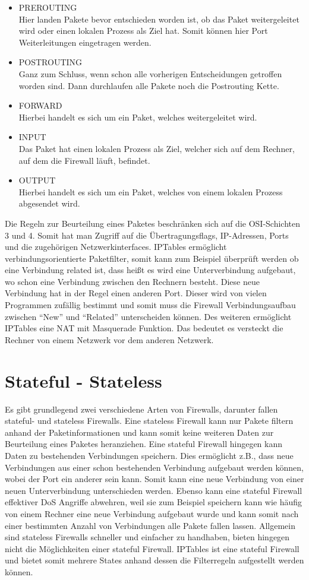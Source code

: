 \begin{itemize}
	\item PREROUTING \\
	Hier landen Pakete bevor entschieden worden ist, ob das Paket weitergeleitet wird oder einen lokalen Prozess als Ziel hat. Somit können hier Port Weiterleitungen eingetragen werden.
	\item POSTROUTING \\
	Ganz zum Schluss, wenn schon alle vorherigen Entscheidungen getroffen worden sind. Dann durchlaufen alle Pakete noch die Postrouting Kette.
	\item FORWARD \\
	Hierbei handelt es sich um ein Paket, welches weitergeleitet wird.
	\item INPUT \\
	Das Paket hat einen lokalen Prozess als Ziel, welcher sich auf dem Rechner, auf dem die Firewall läuft, befindet.
	\item OUTPUT \\
	Hierbei handelt es sich um ein Paket, welches von einem lokalen Prozess abgesendet wird.
\end{itemize}
Die Regeln zur Beurteilung eines Paketes beschränken sich auf die OSI-Schichten 3 und 4. Somit hat man Zugriff auf die Übertragungsflags, IP-Adressen, Ports und die zugehörigen Netzwerkinterfaces. IPTables ermöglicht verbindungsorientierte Paketfilter, somit kann zum Beispiel überprüft werden ob eine Verbindung related ist, dass heißt es wird eine Unterverbindung aufgebaut, wo schon eine Verbindung zwischen den Rechnern besteht. Diese neue Verbindung hat in der Regel einen anderen Port. Dieser wird von vielen Programmen zufällig bestimmt und somit muss die Firewall Verbindungsaufbau zwischen "`New"' und "`Related"' unterscheiden können. Des weiteren ermöglicht IPTables eine NAT mit Masquerade Funktion. Das bedeutet es versteckt die Rechner von einem Netzwerk vor dem anderen Netzwerk.

\section{Stateful - Stateless}
Es gibt grundlegend zwei verschiedene Arten von Firewalls, darunter fallen stateful- und stateless Firewalls. Eine stateless Firewall kann nur Pakete filtern anhand der Paketinformationen und kann somit keine weiteren Daten zur Beurteilung eines Paketes heranziehen. Eine stateful Firewall hingegen kann Daten zu bestehenden Verbindungen speichern. Dies ermöglicht z.B., dass neue Verbindungen aus einer schon bestehenden Verbindung aufgebaut werden können, wobei der Port ein anderer sein kann. Somit kann eine neue Verbindung von einer neuen Unterverbindung unterschieden werden. Ebenso kann eine stateful Firewall effektiver DoS Angriffe abwehren, weil sie zum Beispiel speichern kann wie häufig von einem Rechner eine neue Verbindung aufgebaut wurde und kann somit nach einer bestimmten Anzahl von Verbindungen alle Pakete fallen lassen. Allgemein sind stateless Firewalls schneller und einfacher zu handhaben, bieten hingegen nicht die Möglichkeiten einer stateful Firewall. IPTables ist eine stateful Firewall und bietet somit mehrere States anhand dessen die Filterregeln aufgestellt werden können.

